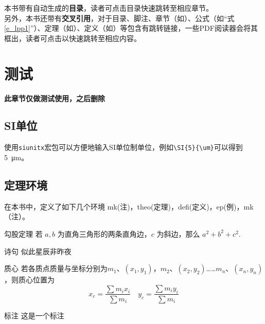 \documentclass{gbook}
\begin{document}
本书带有自动生成的\textbf{目录}，读者可点击目录快速跳转至相应章节。
~\\

另外，本书还带有\textbf{交叉引用}，对于目录、脚注、章节（如）、公式（如“式\eqref{e_lpp1}”）、定理（如）、定义（如）等包含有跳转链接，一些PDF阅读器会将其框出，读者可点击以快速跳转至相应内容。

\newpage


\setcounter{page}{1}

\tableofcontents

\newpage

\setcounter{page}{1}










\chapter{测试}

\textbf{此章节仅做测试使用，之后删除}

\section{SI单位}

使用\verb+siunitx+宏包可以方便地输入SI单位制单位，例如\verb+\SI{5}{\um}+可以得到\SI{5}{\um}。

\section{定理环境}

在本书中，定义了如下几个环境
mk(注)，theo(定理)，defi(定义)，ep(例)，mk（注）。

\begin{theo}{勾股定理}{}
若 $a,b$ 为直角三角形的两条直角边，$c$ 为斜边，那么 $a^2 + b^2 + c^2.$
\end{theo}

\begin{ep}{诗句}{}
似此星辰非昨夜
\end{ep}

\begin{defi}{质心}{}
若各质点质量与坐标分别为$m_1$、$(x_1,y_1)$，$m_2$、$(x_2,y_2)$……$m_n$、$(x_n,y_n)$，则质心位置为
$$x_c = \frac{\sum m_i x_i}{\sum m_i} \quad y_c = \frac{\sum m_i y_i}{\sum m_i}$$
\end{defi}

\begin{mk}{标注}{}
这是一个标注
\end{mk}
\end{document}
